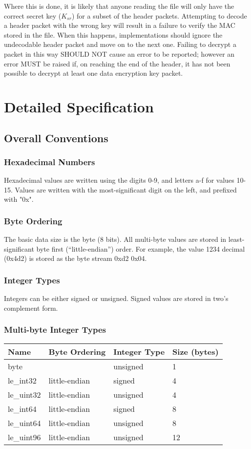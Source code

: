 \documentclass[10pt]{article}
\begin{document}
Where this is done, it is likely that anyone reading the file will only have the correct secret key ($K_{sr}$) for a
subset of the header packets.
Attempting to decode a header packet with the wrong key will result in a failure to verify the MAC stored in the file.
When this happens, implementations should ignore the undecodable header packet and move on to the next one.
Failing to decrypt a packet in this way SHOULD NOT cause an error to be reported;
however an error MUST be raised if, on reaching the end of the header,
it has not been possible to decrypt at least one data encryption key packet.

\section{Detailed Specification}
\subsection{Overall Conventions}
\subsubsection{Hexadecimal Numbers}
Hexadecimal values are written using the digits 0-9, and letters a-f for values 10-15.
Values are written with the most-significant digit on the left, and prefixed with "0x".

\subsubsection{Byte Ordering}
The basic data size is the byte (8 bits).
All multi-byte values are stored in least-significant byte first (``little-endian'') order.
For example, the value 1234 decimal (0x4d2) is stored as the byte stream 0xd2 0x04.

\subsubsection{Integer Types}
Integers can be either signed or unsigned.
Signed values are stored in two's complement form.

\subsubsection{Multi-byte Integer Types}
\begin{center}
\begin{tabular}{l l l l}
\hline
\textbf{Name} & \textbf{Byte Ordering} & \textbf{Integer Type} & \textbf{Size (bytes)} \\
\hline
byte & & unsigned & 1 \\
le\_int32 & little-endian & signed & 4 \\
le\_uint32 & little-endian & unsigned & 4 \\
le\_int64 & little-endian & signed & 8 \\
le\_uint64 & little-endian & unsigned & 8 \\
le\_uint96 & little-endian & unsigned & 12 \\
\end{tabular}
\end{center}
\end{document}
